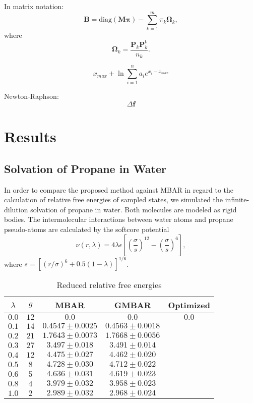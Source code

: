 \documentclass[aip,jcp,reprint,amsmath,amssymb]{revtex4-1}
\newcommand{\mt}[1]{\boldsymbol{\mathbf{#1}}}           %
\newcommand{\vt}[1]{\boldsymbol{\mathbf{#1}}}           %
\newcommand{\tr}[1]{#1^\text{t}}                        %
\begin{document}
In matrix notation:
\begin{equation*}
\mt B = \text{diag}(\mt M \vt \pi) - \sum_{k=1}^m \pi_k \mt \Omega_k,
\end{equation*}
where
\begin{equation*}
\mt \Omega_k = \frac{\mt P_k \tr{\mt P}_k}{n_k}.
\end{equation*}


\begin{equation}
x_{max} + \ln \sum_{i=1}^n a_i e^{x_i -x_{max}}
\end{equation}

Newton-Raphson:
\begin{equation*}
\Delta \vt f
\end{equation*}

\section{Results}

\subsection{Solvation of Propane in Water}

In order to compare the proposed method against MBAR in regard to the calculation of relative free energies of sampled states, we simulated the infinite-dilution solvation of propane in water. Both molecules are modeled as rigid bodies. The intermolecular interactions between water atoms and propane pseudo-atoms are calculated by the softcore potential\cite{Beutler_1994}
\begin{equation*}
\nu(r,\lambda) = 4\lambda\epsilon\left[\left(\frac{\sigma}{s}\right)^{12} - \left(\frac{\sigma}{s}\right)^6\right],
\end{equation*}
where $s = [(r/\sigma)^6 + 0.5 (1-\lambda)]^{1/6}$.

\begin{table}
\caption{Reduced relative free energies}
\label{table:propane solvation}
\begin{ruledtabular}
\begin{tabular}{ccccc}
$\lambda$ & $g$ & MBAR & GMBAR & Optimized \\
\hline
$0.0$ & $12$ & $0.0$ & $0.0$ & $0.0$ \\
$0.1$ & $14$ & $0.4547 \pm 0.0025$ & $0.4563 \pm 0.0018$ \\
$0.2$ & $21$ & $1.7643 \pm 0.0073$ & $1.7668 \pm 0.0056$ \\
$0.3$ & $27$ &  $3.497 \pm 0.018$  &  $3.491 \pm 0.014$ \\
$0.4$ & $12$ &  $4.475 \pm 0.027$  &  $4.462 \pm 0.020$ \\
$0.5$ & $8$  &  $4.728 \pm 0.030$  &  $4.712 \pm 0.022$ \\
$0.6$ & $5$  &  $4.636 \pm 0.031$  &  $4.619 \pm 0.023$ \\
$0.8$ & $4$  &  $3.979 \pm 0.032$  &  $3.958 \pm 0.023$ \\
$1.0$ & $2$  &  $2.989 \pm 0.032$  &  $2.968 \pm 0.024$
\end{tabular}
\end{ruledtabular}
\end{table}
\end{document}
